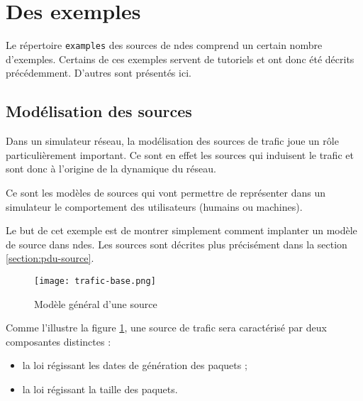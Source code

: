 %
\section{Des exemples}

   Le répertoire {\tt examples} des sources de {\sc ndes} comprend un
certain nombre d'exemples. Certains de ces exemples servent de
tutoriels et ont donc été décrits précédemment. D'autres sont
présentés ici.

%
\subsection{Modélisation des sources}
\label{subsection:trafic-base}

   Dans un simulateur réseau, la modélisation des sources de trafic
joue un rôle particulièrement important. Ce sont en effet les sources
qui induisent le trafic et sont donc à l'origine de la dynamique du
réseau.

   Ce sont les modèles de sources qui vont permettre de représenter
dans un simulateur le comportement des utilisateurs (humains ou
machines).

   Le but de cet exemple est de montrer simplement comment implanter
un modèle de source dans {\sc ndes}. Les sources sont décrites plus
précisément dans la section \ref{section:pdu-source}.

\begin{figure}[h]
\begin{center}
\texttt{[image: trafic-base.png]}
\caption{Modèle général d'une source\label{figure:trafic-base}}
\end{center}
\end{figure}

   Comme l'illustre la figure \ref{figure:trafic-base}, une source de
trafic sera caractérisé par deux composantes distinctes :
 
\begin{itemize}
   \item la loi régissant les dates de génération des paquets ;
   \item la loi régissant la taille des paquets.
\end{itemize}

